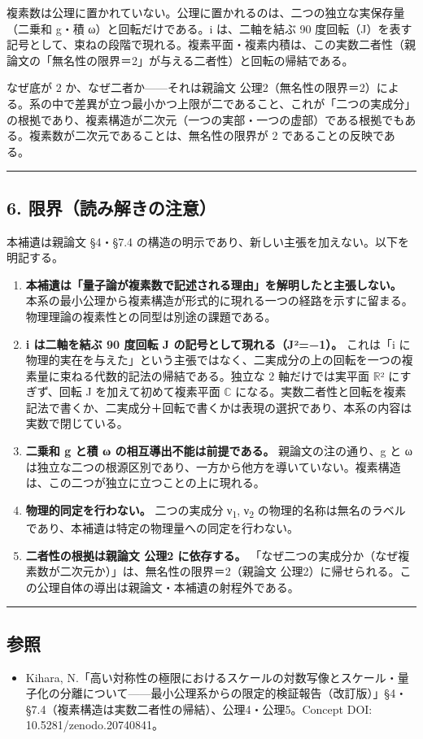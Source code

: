 \documentclass[11pt]{ltjsarticle}
\providecommand{\tightlist}{\setlength{\itemsep}{0pt}\setlength{\parskip}{0pt}}
\begin{document}
複素数は公理に置かれていない。公理に置かれるのは、二つの独立な実保存量（二乗和
g・積 ω）と回転だけである。i は、二軸を結ぶ 90
度回転（J）を表す記号として、束ねの段階で現れる。複素平面・複素内積は、この実数二者性（親論文の「無名性の限界＝2」が与える二者性）と回転の帰結である。

なぜ底が 2 か、なぜ二者か------それは親論文
公理2（無名性の限界＝2）による。系の中で差異が立つ最小かつ上限が二であること、これが「二つの実成分」の根拠であり、複素構造が二次元（一つの実部・一つの虚部）である根拠でもある。複素数が二次元であることは、無名性の限界が
2 であることの反映である。

\begin{center}\rule{0.5\linewidth}{0.5pt}\end{center}

\subsection{6.
限界（読み解きの注意）}\label{ux9650ux754cux8aadux307fux89e3ux304dux306eux6ce8ux610f}

本補遺は親論文 §4・§7.4
の構造の明示であり、新しい主張を加えない。以下を明記する。

\begin{enumerate}
\def\labelenumi{\arabic{enumi}.}
\item
  \textbf{本補遺は「量子論が複素数で記述される理由」を解明したと主張しない。}
  本系の最小公理から複素構造が形式的に現れる一つの経路を示すに留まる。物理理論の複素性との同型は別途の課題である。
\item
  \textbf{i は二軸を結ぶ 90 度回転 J の記号として現れる（J²=−1）。}
  これは「i
  に物理的実在を与えた」という主張ではなく、二実成分の上の回転を一つの複素量に束ねる代数的記法の帰結である。独立な
  2 軸だけでは実平面 $\mathbb{R}$² にすぎず、回転 J を加えて初めて複素平面 $\mathbb{C}$
  になる。実数二者性と回転を複素記法で書くか、二実成分＋回転で書くかは表現の選択であり、本系の内容は実数で閉じている。
\item
  \textbf{二乗和 g と積 ω の相互導出不能は前提である。}
  親論文の注の通り、g と ω
  は独立な二つの根源区別であり、一方から他方を導いていない。複素構造は、この二つが独立に立つことの上に現れる。
\item
  \textbf{物理的同定を行わない。} 二つの実成分 ν\textsubscript{1}, ν\textsubscript{2}
  の物理的名称は無名のラベルであり、本補遺は特定の物理量への同定を行わない。
\item
  \textbf{二者性の根拠は親論文 公理2 に依存する。}
  「なぜ二つの実成分か（なぜ複素数が二次元か）」は、無名性の限界＝2（親論文
  公理2）に帰せられる。この公理自体の導出は親論文・本補遺の射程外である。
\end{enumerate}

\begin{center}\rule{0.5\linewidth}{0.5pt}\end{center}

\subsection{参照}\label{ux53c2ux7167}

\begin{itemize}
\tightlist
\item
  Kihara,
  N.「高い対称性の極限におけるスケールの対数写像とスケール・量子化の分離について------最小公理系からの限定的検証報告（改訂版）」§4・§7.4（複素構造は実数二者性の帰結）、公理4・公理5。Concept
  DOI: 10.5281/zenodo.20740841。
\end{itemize}
\end{document}
